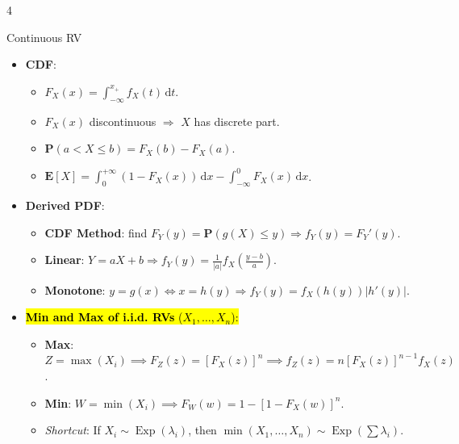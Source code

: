 \documentclass[landscape,a4paper]{article}
\renewcommand{\emph}[1]{\hl{#1}}
\newcommand{\PP}{\mathbf{P}}
\newcommand{\EE}{\mathbf{E}}
\newcommand{\var}{\operatorname{var}}
\begin{document}
\begin{multicols*}{4}
\begin{card}{Continuous RV}
\begin{itemize}
\begin{itemize}
\begin{itemize}
						\item $F_\Lambda(\lambda)=\varPhi(\lambda),\Lambda\sim N(0,1)$.
						\item $\EE[X]=\mu$,
						\item $\EE[X^2]=\mu^2+\sigma^2$,
						\item $\EE[X^4]=3\sigma^4+6\sigma^2\mu^2+\mu^4$,
						\item $\var[X]=\sigma^2$.
						\item $Y=\alpha X+\beta\sim N(\alpha\mu+\beta,\alpha^2\sigma^2)$.
					\end{itemize}
				\end{itemize}
				\item \textbf{CDF}:\begin{itemize}
					\item $F_X(x)=\int_{-\infty}^{x_+} f_X(t)\,\mathrm dt$.
					\item $F_X(x)$ discontinuous $\Rightarrow$ $X$ has discrete part.
					\item $\PP(a<X\le b)=F_X(b)-F_X(a)$.
					\item $\EE[X]=\int_0^{+\infty}(1-F_X(x))\,\mathrm dx-\int_{-\infty}^0F_X(x)\,\mathrm dx$.
				\end{itemize}
				\item \textbf{Derived PDF}:
				\begin{itemize}
					\item \textbf{CDF Method}: find $F_Y(y)=\PP(g(X)\le y)\Rightarrow f_Y(y)=F_Y'(y)$.
					\item \textbf{Linear}: $Y=aX+b\Rightarrow f_Y(y)=\frac{1}{|a|}f_X\left(\frac{y-b}{a}\right)$.
					\item \textbf{Monotone}: $y=g(x)\Leftrightarrow x=h(y)\Rightarrow f_Y(y)=f_X(h(y))|h'(y)|$.
				\end{itemize}
				
				\item \emph{\textbf{Min and Max of i.i.d. RVs} ($X_1, \dots, X_n$):}
				\begin{itemize}
					\item \textbf{Max}: $Z = \max(X_i) \implies F_Z(z) = [F_X(z)]^n \implies f_Z(z) = n[F_X(z)]^{n-1} f_X(z)$.
					\item \textbf{Min}: $W = \min(X_i) \implies F_W(w) = 1 - [1 - F_X(w)]^n$.
					\item \textit{Shortcut}: If $X_i \sim \operatorname{Exp}(\lambda_i)$, then $\min(X_1, \dots, X_n) \sim \operatorname{Exp}(\sum \lambda_i)$.
				\end{itemize}
				

\end{itemize}
\end{card}
\end{multicols*}
\end{document}

